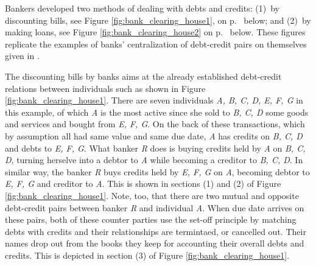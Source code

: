 Bankers developed two methods of dealing with debts and credits: (1)~by discounting bills, see Figure \ref{fig:bank_clearing_house1}, on p.~\pageref{fig:bank_clearing_house1} below; and (2)~by making loans, see Figure \ref{fig:bank_clearing_house2} on p.~\pageref{fig:bank_clearing_house2} below. These figures replicate the examples of banks' centralization of debt-credit pairs on themselves given in \citep[pp.~402-403]{innes1913}. 

The discounting bills by banks aims at the already established debt-credit relations between individuals such as shown in Figure \ref{fig:bank_clearing_house1}. There are seven individuals \textit{A, B, C, D, E, F, G} in this example, of which \textit{A} is the most active since she sold to \textit{B, C, D} some goods and services and bought from \textit{E, F, G}. On the back of these transactions, which by assumption all had same value and same due date, \textit{A} has credits on \textit{B, C, D} and debts to \textit{E, F, G}. What banker \textit{R} does is buying credits held by \textit{A} on \textit{B, C, D}, turning herselve into a debtor to \textit{A} while becoming a creditor to \textit{B, C, D}. In similar way, the banker \textit{R} buys credits held by \textit{E, F, G} on \textit{A}, becoming debtor to  \textit{E, F, G} and creditor to \textit{A}. This is shown in sections (1) and (2) of Figure \ref{fig:bank_clearing_house1}. Note, too, that there are two mutual and opposite debt-credit pairs between banker \textit{R} and individual \textit{A}. When due date arrives on these pairs, both of these counter parties use the set-off principle by matching debts with credits and their relationships are termintaed, or cancelled out. Their names drop out from the books they keep for accounting their overall debts and credits. This is depicted in section (3) of Figure \ref{fig:bank_clearing_house1}.

